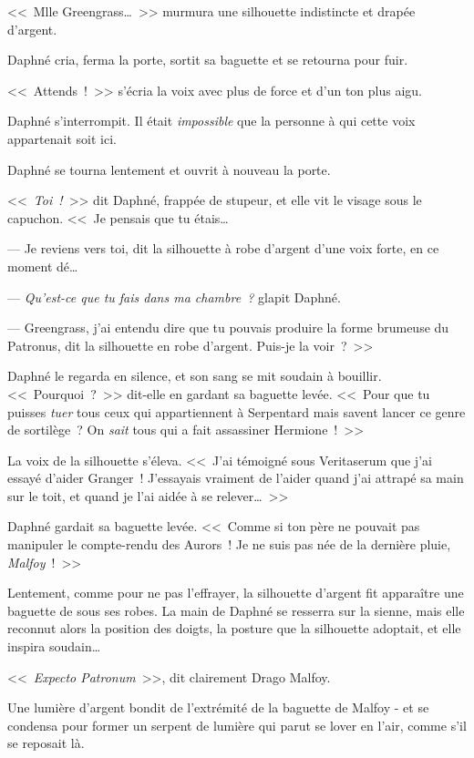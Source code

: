 <<~Mlle Greengrass…~>> murmura une silhouette indistincte et drapée d'argent.

Daphné cria, ferma la porte, sortit sa baguette et se retourna pour fuir.

<<~Attends~!~>> s'écria la voix avec plus de force et d'un ton plus aigu.

Daphné s'interrompit. Il était \emph{impossible} que la personne à qui cette voix appartenait soit ici.

Daphné se tourna lentement et ouvrit à nouveau la porte.

<<~\emph{Toi~!}~>> dit Daphné, frappée de stupeur, et elle vit le visage sous le capuchon. <<~Je pensais que tu étais…

--- Je reviens vers toi, dit la silhouette à robe d'argent d'une voix forte, en ce moment dé…

--- \emph{Qu'est-ce que tu fais dans ma chambre~?} glapit Daphné.

--- Greengrass, j'ai entendu dire que tu pouvais produire la forme brumeuse du Patronus, dit la silhouette en robe d'argent. Puis-je la voir~?~>>

Daphné le regarda en silence, et son sang se mit soudain à bouillir. <<~Pourquoi~?~>> dit-elle en gardant sa baguette levée. <<~Pour que tu puisses \emph{tuer} tous ceux qui appartiennent à Serpentard mais savent lancer ce genre de sortilège~? On \emph{sait} tous qui a fait assassiner Hermione~!~>>

La voix de la silhouette s'éleva. <<~J'ai témoigné sous Veritaserum que j'ai essayé d'aider Granger~! J'essayais vraiment de l'aider quand j'ai attrapé sa main sur le toit, et quand je l'ai aidée à se relever…~>>

Daphné gardait sa baguette levée. <<~Comme si ton père ne pouvait pas manipuler le compte-rendu des Aurors~! Je ne suis pas née de la dernière pluie, \emph{Malfoy}~!~>>

Lentement, comme pour ne pas l'effrayer, la silhouette d'argent fit apparaître une baguette de sous ses robes. La main de Daphné se resserra sur la sienne, mais elle reconnut alors la position des doigts, la posture que la silhouette adoptait, et elle inspira soudain…

<<~\emph{Expecto Patronum}~>>, dit clairement Drago Malfoy.

Une lumière d'argent bondit de l'extrémité de la baguette de Malfoy - et se condensa pour former un serpent de lumière qui parut se lover en l'air, comme s'il se reposait là.

